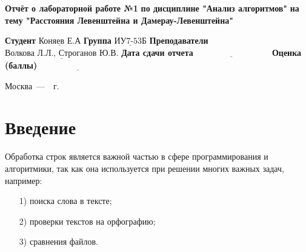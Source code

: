 \documentclass[12pt]{report}
\begin{document}
\begin{titlepage}
		
		\begin{center}
			\noindent\begin{minipage}{1.3\textwidth}\centering
				\Large\textbf{  Отчёт о лабораторной работе №1}\newline
				\textbf{по дисциплине "Анализ алгоритмов"}\newline
				\textbf{на тему "Расстояния Левенштейна и Дамерау-Левенштейна"}\newline\newline
			\end{minipage}
		\end{center}
		
		\noindent\textbf{Студент} $\underline{\text{Коняев Е.А}}$\newline\newline
		\noindent\textbf{Группа} $\underline{\text{ИУ7-53Б}}$\newline\newline
		\noindent\textbf{Преподаватели} $\underline{\text{Волкова Л.Л., Строганов Ю.В.}}$\newline\newline
		\noindent\textbf{Дата сдачи отчета}$\underline{\text{~~~~~~~~~~~~~~~~~~~~~~~~~~~}}$\newline\newline
		\noindent\textbf{Оценка (баллы)} $\underline{\text{~~~~~~~~~~~~~~~~~~~~~~~~~~~}}$\newline\newline\newline
		
		\begin{center}
			\vfill
			Москва~---~\the\year~г.
		\end{center}
	\end{titlepage}
	
	\setcounter{page}{2}
	\tableofcontents
	
	\newpage
	\chapter*{Введение}
	
	
	
Обработка строк является важной частью в сфере программирования и алгоритмики, так как она используется при решении многих важных задач, например:

\begin{enumerate}
	\item[1)] поиска слова в тексте;
	\item[2)] проверки текстов на орфографию;
	\item[3)] сравнения файлов.
\end{enumerate}
\end{document}
